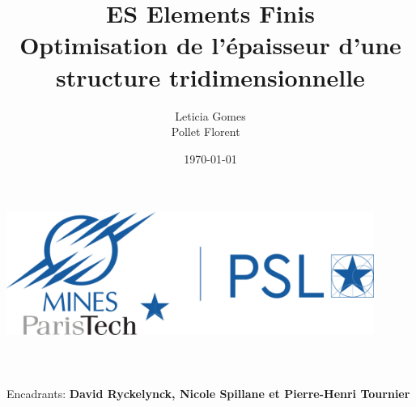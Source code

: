 \title{\Large ES Elements Finis  \\[0.5cm]
        \bf\Large Optimisation de l'épaisseur d'une structure tridimensionnelle}
\author{\large Leticia Gomes\\Pollet Florent \ \\}
\date{\large\today}

\makeatletter
    \begin{titlepage}
        \begin{center}
	   { \includegraphics[width=12cm]{mp_logo.png}}
	   {\ \\ \ \\}
        \vbox{}\vspace{5cm}
            {\@title }\\[3cm] 
            {\@author}
            {\large \ \\ Encadrants: \bf David Ryckelynck, Nicole Spillane et Pierre-Henri Tournier\\ \ \\}
            {\@date\\}

        \end{center}
    \end{titlepage}

    \tableofcontents

    \clearpage
\makeatother
